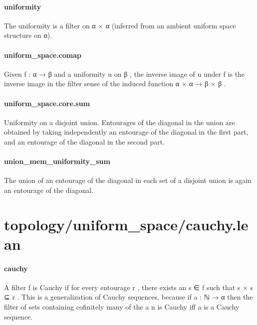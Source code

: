 \documentclass{article}
\begin{document}
\paragraph{uniformity}
\par
The uniformity is a filter on α × α (inferred from an ambient uniform space
structure on α).
\paragraph{uniform\_space.comap}
\par
Given 
\colorbox[RGB]{253,246,227}{{{{\color[RGB]{101, 123, 131} f : α  }}}{{{\color[RGB]{133, 153, 0} → }}}{{{\color[RGB]{101, 123, 131}  β }}}} and a uniformity 
\colorbox[RGB]{253,246,227}{{{{\color[RGB]{101, 123, 131} u }}}} on 
\colorbox[RGB]{253,246,227}{{{{\color[RGB]{101, 123, 131} β }}}}, the inverse image of 
\colorbox[RGB]{253,246,227}{{{{\color[RGB]{101, 123, 131} u }}}} under 
\colorbox[RGB]{253,246,227}{{{{\color[RGB]{101, 123, 131} f }}}}is the inverse image in the filter sense of the induced function 
\colorbox[RGB]{253,246,227}{{{{\color[RGB]{101, 123, 131} α × α  }}}{{{\color[RGB]{133, 153, 0} → }}}{{{\color[RGB]{101, 123, 131}  β × β }}}}.
\paragraph{uniform\_space.core.sum}
\par
Uniformity on a disjoint union. Entourages of the diagonal in the union are obtained
by taking independently an entourage of the diagonal in the first part, and an entourage of
the diagonal in the second part.
\paragraph{union\_mem\_uniformity\_sum}
\par
The union of an entourage of the diagonal in each set of a disjoint union is again an entourage of the diagonal.
\section{topology/uniform\_space/cauchy.lean}\paragraph{cauchy}
\par
A filter 
\colorbox[RGB]{253,246,227}{{{{\color[RGB]{101, 123, 131} f }}}} is Cauchy if for every entourage 
\colorbox[RGB]{253,246,227}{{{{\color[RGB]{101, 123, 131} r }}}}, there exists an
\colorbox[RGB]{253,246,227}{{{{\color[RGB]{101, 123, 131} s ∈ f }}}} such that 
\colorbox[RGB]{253,246,227}{{{{\color[RGB]{101, 123, 131} s × s ⊆ r }}}}. This is a generalization of Cauchy
sequences, because if 
\colorbox[RGB]{253,246,227}{{{{\color[RGB]{101, 123, 131} a : ℕ  }}}{{{\color[RGB]{133, 153, 0} → }}}{{{\color[RGB]{101, 123, 131}  α }}}} then the filter of sets containing
cofinitely many of the 
\colorbox[RGB]{253,246,227}{{{{\color[RGB]{101, 123, 131} a n }}}} is Cauchy iff 
\colorbox[RGB]{253,246,227}{{{{\color[RGB]{101, 123, 131} a }}}} is a Cauchy sequence.
\end{document}

